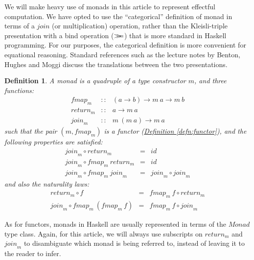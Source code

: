 \documentclass{jfp1}
\newcommand{\mbind}{\mathrel{>\kern-0.45em>\kern-0.45em=}}
\newtheorem{definition}{Definition}
\newcommand{\defref}[1]{\hyperref[#1]{Definition \ref*{#1}}}
\begin{document}
We will make heavy use of monads in this article to represent
effectful computation. We have opted to use the ``categorical''
definition of monad in terms of a $\mathit{join}$ (or multiplication)
operation, rather than the Kleisli-triple presentation with a bind
operation ($\mbind$) that is more standard in Haskell programming. For
our purposes, the categorical definition is more convenient for
equational reasoning. Standard references such as the lecture notes by
Benton, Hughes and Moggi \cite{benton00monads} discuss the
translations between the two presentations.

\begin{definition}
  A monad is a quadruple of a type constructor $m$, and three
  functions:
  \begin{displaymath}
    \begin{array}{rcl}
      \mathit{fmap}_m   & :: & (a \to b) \to m~a \to m~b \\
      \mathit{return}_m & :: & a \to m~a \\
      \mathit{join}_m   & :: & m~(m~a) \to m~a
    \end{array}
  \end{displaymath}
  such that the pair $(m, \mathit{fmap}_m)$ is a functor
  (\defref{defn:functor}), and the following properties are satisfied:
  \begin{displaymath}
    \begin{array}{rcl}
      \mathit{join}_m \circ \mathit{return}_m & = & \mathit{id} \\
      \mathit{join}_m \circ \mathit{fmap}_m~\mathit{return}_m & = & \mathit{id} \\
      \mathit{join}_m \circ \mathit{fmap}_m~\mathit{join}_m & = & \mathit{join}_m \circ \mathit{join}_m
    \end{array}
  \end{displaymath}
  and also the naturality laws:
  \begin{displaymath}
    \begin{array}{rcl}
      \mathit{return}_m \circ f & = & \mathit{fmap}_m~f \circ \mathit{return}_m \\
      \mathit{join}_m \circ \mathit{fmap}_m~(\mathit{fmap}_m~f) & = & \mathit{fmap}_m~f \circ \mathit{join}_m
    \end{array}
  \end{displaymath}
\end{definition}

As for functors, monads in Haskell are usually represented in terms of
the $\textit{Monad}$ type class. Again, for this article, we will
always use subscripts on $\mathit{return}_m$ and $\mathit{join}_m$ to
disambiguate which monad is being referred to, instead of leaving it
to the reader to infer.
\end{document}
